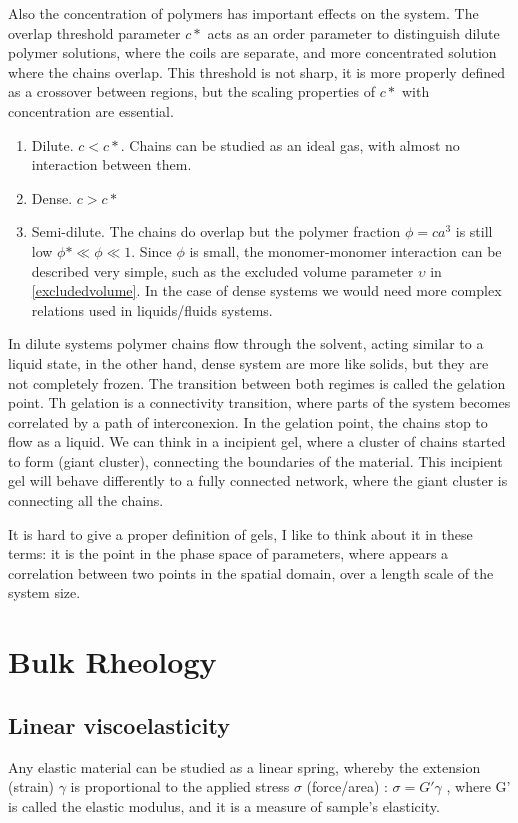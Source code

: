 Also the concentration of polymers has important effects on the system. The
overlap threshold parameter $c*$ acts as an order parameter to distinguish dilute
polymer solutions, where the coils are separate, and more concentrated solution
where the chains overlap. This threshold is not sharp, it is more properly
defined as a crossover between regions, but the scaling properties of $c*$ with
concentration are essential.
\begin{enumerate}
  \item Dilute. $c<c*$. Chains can be studied as an ideal gas, with almost no
  interaction between them.
  \item Dense. $c>c*$
  \item Semi-dilute. The chains do overlap but the polymer fraction
  $\phi=ca^3$ is still low $\phi*\ll\phi\ll1$. Since $\phi$ is small, the monomer-monomer interaction can
  be described very simple, such as the excluded volume parameter $\upsilon$ in
  \ref{excludedvolume}. In the case of dense systems we would need more complex
  relations used in liquids/fluids systems. 
\end{enumerate}


In dilute systems polymer chains flow through
the solvent, acting similar to a liquid state, in the other hand, dense system
are more like solids, but they are not completely frozen. The transition between
both regimes is called the gelation point. Th gelation is a connectivity
transition, where parts of the system becomes correlated by a path of
interconexion. In the gelation point, the chains stop to flow as a liquid. We
can think in a incipient gel, where a cluster of chains started to form (giant cluster), connecting the boundaries of the
material. This incipient gel will behave differently to a fully connected
network, where the giant cluster is connecting all the chains.

It is hard to give a proper definition of gels\citep{gennes_scaling_1979,rubinstein_polymer_2003}, I
like to think about it in these terms: it is the point in the phase space of
parameters, where appears a correlation between two points in the spatial
domain, over a length scale of the system size.

\section{Bulk Rheology}
\subsection{Linear viscoelasticity}
Any elastic material can be studied as a linear spring, whereby the
extension (strain) $\gamma$ is proportional to the applied stress $\sigma$ (force/area) :
$\sigma=G'\gamma$ , where G' is called the elastic modulus, and it is a measure
of sample's elasticity.

